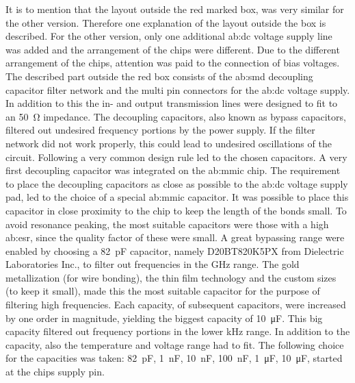 It is to mention that the layout outside the red marked box, was very similar for the other version.
Therefore one explanation of the layout outside the box is described.
For the other version, only one additional \gls{ab:dc} voltage supply line was added and the arrangement of the chips were different.
Due to the different arrangement of the chips, attention was paid to the connection of bias voltages.
The described part outside the red box consists of the \gls{ab:smd} decoupling capacitor filter network and the multi pin connectors for the \gls{ab:dc} voltage supply.
In addition to this the in- and output transmission lines were designed to fit to an \SI{50}{\ohm} impedance.
The decoupling capacitors, also known as bypass capacitors, filtered out undesired frequency portions by the power supply.
If the filter network did not work properly, this could lead to undesired oscillations of the circuit.
Following a very common design rule led to the chosen capacitors.
A very first decoupling capacitor was integrated on the \gls{ab:mmic} chip.
The requirement to place the decoupling capacitors as close as possible to the \gls{ab:dc} voltage supply pad, led to the choice of a special \gls{ab:mmic} capacitor.
It was possible to place this capacitor in close proximity to the chip to keep the length of the bonds small.
To avoid resonance peaking, the most suitable capacitors were those with a high \gls{ab:esr}, since the quality factor of these were small.
A great bypassing range were enabled by choosing a \SI{82}{\pico \farad} capacitor, namely D20BT820K5PX from Dielectric Laboratories Inc., to filter out frequencies in the GHz range.
The gold metallization (for wire bonding), the thin film technology and the custom sizes (to keep it small), made this the most suitable capacitor for the purpose of filtering high frequencies.
Each capacity, of subsequent capacitors, were increased by one order in magnitude, yielding the biggest capacity of \SI{10}{\micro \farad}.
This big capacity filtered out frequency portions in the lower \si{\kilo \hertz} range.
In addition to the capacity, also the temperature and voltage range had to fit.
The following choice for the capacities was taken: \SI{82}{\pico \farad}, \SI{1}{\nano \farad}, \SI{10}{\nano \farad}, \SI{100}{\nano \farad}, \SI{1}{\micro \farad}, \SI{10}{\micro \farad}, started at the chips supply pin. \\
